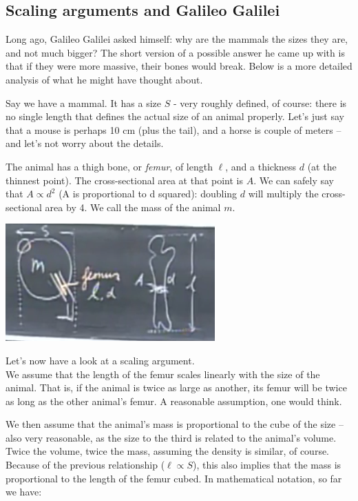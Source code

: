 \documentclass[8.01x]{subfiles}
\begin{document}
\subsection{Scaling arguments and Galileo Galilei}

Long ago, Galileo Galilei asked himself: why are the mammals the sizes they are, and not much bigger? The short version of a possible answer he came up with is that if they were more massive, their bones would break. Below is a more detailed analysis of what he might have thought about.

Say we have a mammal. It has a size $S$ - very roughly defined, of course: there is no single length that defines the actual size of an animal properly. Let's just say that a mouse is perhaps 10 cm (plus the tail), and a horse is couple of meters -- and let's not worry about the details.

The animal has a thigh bone, or \emph{femur}, of length $\ell$, and a thickness $d$ (at the thinnest point). The cross-sectional area at that point is $A$. We can safely say that $A \propto d^2$ (A is proportional to d squared): doubling $d$ will multiply the cross-sectional area by 4.
We call the mass of the animal $m$.

\begin{center}
\includegraphics[scale=1.0]{Graphics/femur}
\end{center}

Let's now have a look at a scaling argument.\\
We assume that the length of the femur scales linearly with the size of the animal. That is, if the animal is twice as large as another, its femur will be twice as long as the other animal's femur. A reasonable assumption, one would think.

We then assume that the animal's mass is proportional to the cube of the size -- also very reasonable, as the size to the third is related to the animal's volume. Twice the volume, twice the mass, assuming the density is similar, of course.\\
Because of the previous relationship ($\ell \propto S$), this also implies that the mass is proportional to the length of the femur cubed. In mathematical notation, so far we have:
\end{document}
